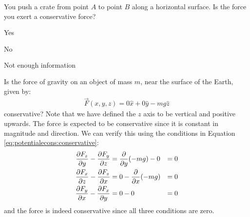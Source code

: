 \begin{checkpoint}
\begin{MCquestion}{You push a crate from point $A$ to point $B$ along a horizontal surface. Is the force you exert a conservative force?
}
\item Yes
\item No \correct
\item Not enough information
\end{MCquestion}
\end{checkpoint}
\begin{example}{\label{ex:potentialecons:gravity}Is the force of gravity on an object of mass $m$, near the surface of the Earth, given by:
\begin{align*}
\vec F(x,y,z) =0\hat x + 0\hat y -mg \hat z
\end{align*}
conservative? Note that we have defined the $z$ axis to be vertical and positive upwards.}
The force is expected to be conservative since it is constant in magnitude and direction. We can verify this using the conditions in Equation \ref{eq:potentialecons:conservative}:
\begin{align*}
\frac{\partial F_z}{\partial y}-\frac{\partial F_y}{\partial z} &= \frac{\partial }{\partial y}(-mg) - 0 &= 0\\
\frac{\partial F_x}{\partial z}-\frac{\partial F_z}{\partial x} &= 0 - \frac{\partial }{\partial x}(-mg) &= 0\\
\frac{\partial F_y}{\partial x}-\frac{\partial F_x}{\partial y} &= 0 - 0 &=0
\end{align*}
and the force is indeed conservative since all three conditions are zero.
\end{example}
\newpage
